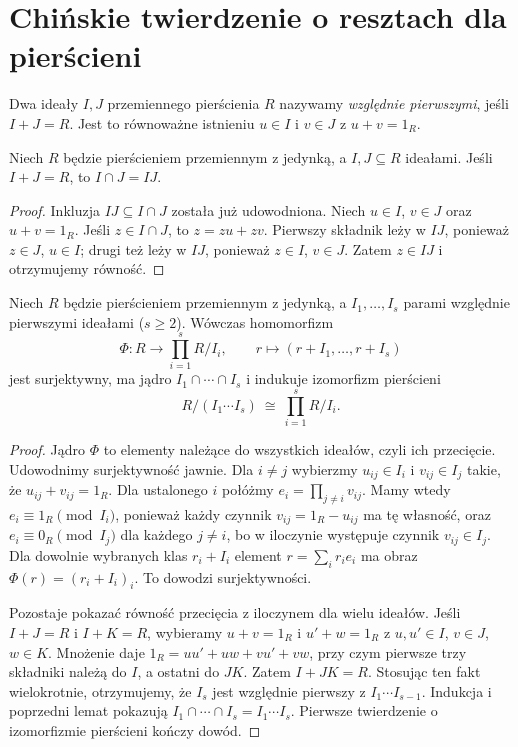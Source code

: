\section{Chińskie twierdzenie o resztach dla pierścieni}
\begin{definicja}
\label{aa:def:comaximal}
Dwa ideały $I,J$ przemiennego pierścienia $R$ nazywamy
\emph{względnie pierwszymi}, jeśli $I+J=R$.
Jest to równoważne istnieniu $u\in I$ i $v\in J$ z $u+v=1_R$.
\end{definicja}
\begin{lemat}
\label{aa:lem:comaximal-intersection}
Niech $R$ będzie pierścieniem przemiennym z jedynką,
a $I,J\subseteq R$ ideałami. Jeśli $I+J=R$, to $I\cap J=IJ$.
\end{lemat}
\begin{proof}
Inkluzja $IJ\subseteq I\cap J$ została już udowodniona.
Niech $u\in I$, $v\in J$ oraz $u+v=1_R$.
Jeśli $z\in I\cap J$, to $z=zu+zv$.
Pierwszy składnik leży w $IJ$, ponieważ $z\in J$, $u\in I$;
drugi też leży w $IJ$, ponieważ $z\in I$, $v\in J$.
Zatem $z\in IJ$ i otrzymujemy równość.
\end{proof}
\begin{twierdzenie}
\label{aa:tw:crt-ring}
Niech $R$ będzie pierścieniem przemiennym z jedynką,
a $I_1,\ldots,I_s$ parami względnie pierwszymi ideałami
($s\ge2$). Wówczas homomorfizm
\[
\Phi:R\longrightarrow \prod_{i=1}^{s}R/I_i,
\qquad r\longmapsto(r+I_1,\ldots,r+I_s)
\]
jest surjektywny, ma jądro $I_1\cap\cdots\cap I_s$
i indukuje izomorfizm pierścieni
\[
R/(I_1\cdots I_s)\ \cong\ \prod_{i=1}^{s}R/I_i.
\]
\end{twierdzenie}
\begin{proof}
Jądro $\Phi$ to elementy należące do wszystkich ideałów,
czyli ich przecięcie. Udowodnimy surjektywność jawnie.
Dla $i\ne j$ wybierzmy $u_{ij}\in I_i$ i $v_{ij}\in I_j$
takie, że $u_{ij}+v_{ij}=1_R$. Dla ustalonego $i$
połóżmy $e_i=\prod_{j\ne i}v_{ij}$. Mamy wtedy
$e_i\equiv1_R\pmod{I_i}$, ponieważ każdy czynnik
$v_{ij}=1_R-u_{ij}$ ma tę własność, oraz
$e_i\equiv0_R\pmod{I_j}$ dla każdego $j\ne i$, bo w
iloczynie występuje czynnik $v_{ij}\in I_j$.
Dla dowolnie wybranych klas $r_i+I_i$ element
$r=\sum_i r_i e_i$ ma obraz $\Phi(r)=(r_i+I_i)_i$.
To dowodzi surjektywności.

Pozostaje pokazać równość przecięcia z iloczynem dla wielu
ideałów. Jeśli $I+J=R$ i $I+K=R$, wybieramy
$u+v=1_R$ i $u'+w=1_R$ z $u,u'\in I$, $v\in J$, $w\in K$.
Mnożenie daje $1_R=uu'+uw+vu'+vw$, przy czym
pierwsze trzy składniki należą do $I$, a ostatni do $JK$.
Zatem $I+JK=R$. Stosując ten fakt wielokrotnie, otrzymujemy,
że $I_s$ jest względnie pierwszy z $I_1\cdots I_{s-1}$.
Indukcja i poprzedni lemat pokazują
$I_1\cap\cdots\cap I_s=I_1\cdots I_s$.
Pierwsze twierdzenie o izomorfizmie pierścieni kończy dowód.
\end{proof}

